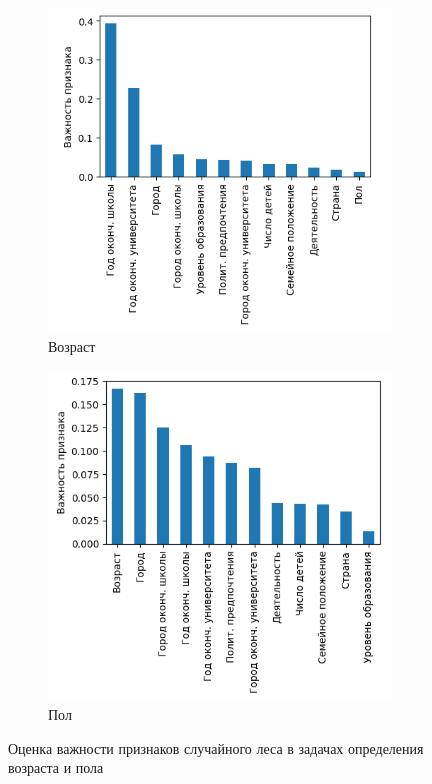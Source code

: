 \begin{figure}[h]
\begin{subfigure}[h]{0.5\linewidth}
\includegraphics[width=\linewidth]{images/rf_age_feature_importance}
\caption{Возраст}
\end{subfigure}
\hfill
\begin{subfigure}[h]{0.5\linewidth}
\includegraphics[width=\linewidth]{images/rf_gender_feature_importance.png}
\caption{Пол}
\end{subfigure}%
\caption{Оценка важности признаков случайного леса в задачах определения возраста и пола}
\label{fig:rf_feature_importace}
\end{figure}



